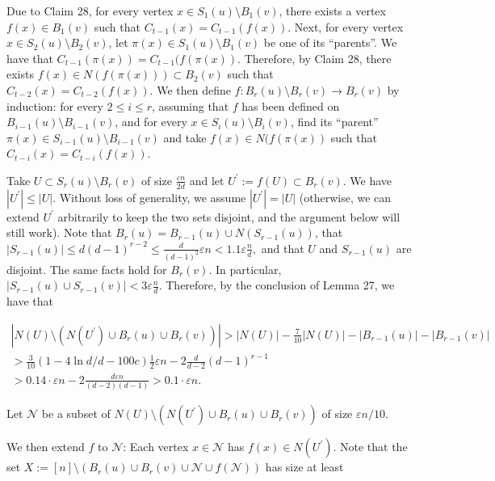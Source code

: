 Due to Claim 28, for every vertex $x\in S_{1}(u)\setminus B_{1}(v)$, there exists a vertex $f(x)\in B_{1}(v)$ such that $C_{t-1}(x)=C_{t-1}(f(x))$. Next, for every vertex $x\in S_{2}(u)\setminus B_{2}(v)$, let $\pi(x)\in S_{1}(u)\setminus B_{1}(v)$ be one of its “parents”. We have that $C_{t-1}(\pi(x))=C_{t-1}(f(\pi(x))$. Therefore, by Claim 28, there exists $f(x)\in N(f(\pi(x)))\subset B_{2}(v)$ such that $C_{t-2}(x)=C_{t-2}(f(x))$. We then define $f:B_{r}(u)\setminus B_{r}(v)\to B_{r}(v)$ by induction: for every $2\leq i\leq r$, assuming that $f$ has been defined on $B_{i-1}(u)\setminus B_{i-1}(v)$, and for every $x\in S_{i}(u)\setminus B_{i}(v)$, find its “parent” $\pi(x)\in S_{i-1}(u)\setminus B_{i-1}(v)$ and take $f(x)\in N(f(\pi(x))$ such that $C_{t-i}(x)=C_{t-i}(f(x))$.\par




Take $U\subset S_{r}(u)\setminus B_{r}(v)$ of size $\frac{\varepsilon n}{2d}$ and let $U^{\prime}:=f(U)\subset B_{r}(v)$. We have $|U^{\prime}|\leq|U|$. Without loss of generality, we assume $|U^{\prime}|=|U|$ (otherwise, we can extend $U^{\prime}$ arbitrarily to keep the two sets disjoint, and the argument below will still work). Note that $B_{r}(u)=B_{r-1}(u)\cup N(S_{r-1}(u))$, that
$|S_{r-1}(u)|\leq d(d-1)^{r-2}\leq\frac{d}{(d-1)^{2}}\varepsilon n<1.1\varepsilon\frac{n}{d},$
and that $U$ and $S_{r-1}(u)$ are disjoint. The same facts hold for $B_{r}(v)$. In particular,
$|S_{r-1}(u)\cup S_{r-1}(v)|<3\varepsilon\frac{n}{d}$.
Therefore, by the conclusion of Lemma 27, we have that\par


\[\begin{gathered}
\displaystyle|N(U)\setminus(N(U^{\prime})\cup B_{r}(u)\cup B_{r}(v))| \displaystyle>|N(U)|-\frac{7}{10}|N(U)|-|B_{r-1}(u)|-|B_{r-1}(v)| \\
\displaystyle>\frac{3}{10}(1-4\ln d/d-100c)\frac{1}{2}\varepsilon n-2\frac{d}{d-2}(d-1)^{r-1} \\
\displaystyle>0.14\cdot\varepsilon n-2\frac{d\varepsilon n}{(d-2)(d-1)}>0.1\cdot\varepsilon n.
\end{gathered}\]


Let $\mathcal{N}$ be a subset of $N(U)\setminus(N(U^{\prime})\cup B_{r}(u)\cup B_{r}(v))$ of size $\varepsilon n/10$.\par




We then extend $f$ to $\mathcal{N}$: Each vertex $x\in\mathcal{N}$ has $f(x)\in N(U^{\prime})$. Note that the set $X:=[n]\setminus(B_{r}(u)\cup B_{r}(v)\cup\mathcal{N}\cup f(\mathcal{N}))$
has size at least\par


